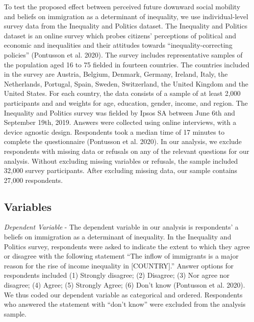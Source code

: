 \documentclass[
  11pt,
]{article}
\begin{document}
To test the proposed effect between perceived future downward social
mobility and beliefs on immigration as a determinant of inequality, we
use individual-level survey data from the Inequality and Politics
dataset. The Inequality and Politics dataset is an online survey which
probes citizens' perceptions of political and economic and inequalities
and their attitudes towards ``inequality-correcting policies''
(Pontusson et al. 2020). The survey includes representative samples of
the population aged 16 to 75 fielded in fourteen countries. The
countries included in the survey are Austria, Belgium, Denmark, Germany,
Ireland, Italy, the Netherlands, Portugal, Spain, Sweden, Switzerland,
the United Kingdom and the United States. For each country, the data
consists of a sample of at least 2,000 participants and and weights for
age, education, gender, income, and region. The Inequality and Politics
survey was fielded by Ipsos SA between June 6th and September 19th,
2019. Answers were collected using online interviews, with a device
agnostic design. Respondents took a median time of 17 minutes to
complete the questionnaire (Pontusson et al. 2020). In our analysis, we
exclude respondents with missing data or refusals on any of the relevant
questions for our analysis. Without excluding missing variables or
refusals, the sample included 32,000 survey participants. After
excluding missing data, our sample contains 27,000 respondents.

\hypertarget{variables}{%
\subsection{\texorpdfstring{\textbf{Variables}}{Variables}}\label{variables}}

\noindent\textit {Dependent Variable} - The dependent variable in our
analysis is respondents' a beliefs on immigration as a determinant of
inequality. In the Inequality and Politics survey, respondents were
asked to indicate the extent to which they agree or disagree with the
following statement ``The inflow of immigrants is a major reason for the
rise of income inequality in {[}COUNTRY{]}.'' Answer options for
respondents included (1) Strongly disagree; (2) Disagree; (3) Nor agree
nor disagree; (4) Agree; (5) Strongly Agree; (6) Don't know (Pontusson
et al. 2020). We thus coded our dependent variable as categorical and
ordered. Respondents who answered the statement with ``don't know'' were
excluded from the analysis sample.

\vspace{0.4cm}
\end{document}
